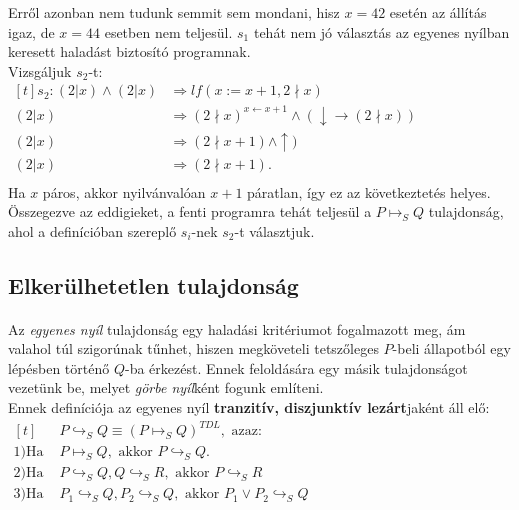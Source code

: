 \documentclass[12pt]{article}
\newcommand{\egyenesnyil}[2]{\ensuremath{#1 \mapsto_S #2}}
\newcommand{\gorbenyil}[2]{\ensuremath{#1 \hookrightarrow_S #2}}
\begin{document}
	Erről azonban nem tudunk semmit sem mondani, hisz $x=42$ esetén az állítás igaz, de $x=44$ esetben nem teljesül. $s_1$ tehát nem jó választás az egyenes nyílban keresett haladást biztosító programnak.\\
	Vizsgáljuk $s_2$-t:\\
	$
	\begin{aligned}[t]
	s_2: (2|x) \land (2|x) &\Rightarrow lf(x:=x+1, 2\nmid x)\\
	(2|x) &\Rightarrow (2\nmid x)^{x\leftarrow x+1} \land (\downarrow \rightarrow (2\nmid x))\\
	(2|x) &\Rightarrow (2\nmid x+1) \land \uparrow)\\
	(2|x) &\Rightarrow (2 \nmid x+1).\\
	\end{aligned}
	$
	\\
	Ha $x$ páros, akkor nyilvánvalóan $x+1$ páratlan, így ez az következtetés helyes. Összegezve az eddigieket, a fenti programra tehát teljesül a \egyenesnyil{P}{Q} tulajdonság, ahol a definícióban szereplő $s_i$-nek $s_2$-t választjuk.
	
	\subsection{Elkerülhetetlen tulajdonság}
	\paragraph{} Az \textit{egyenes nyíl} tulajdonság egy haladási kritériumot fogalmazott meg, ám valahol túl szigorúnak tűnhet, hiszen megköveteli tetszőleges $P$-beli állapotból egy lépésben történő $Q$-ba érkezést. Ennek feloldására egy másik tulajdonságot vezetünk be, melyet \textit{görbe nyíl}ként fogunk említeni.\\
	Ennek definíciója az egyenes nyíl \textbf{tranzitív, diszjunktív lezárt}jaként áll elő:\\
	$
	\begin{aligned}[t]
	&P \hookrightarrow_S Q \equiv (P\mapsto_S Q)^{TDL}, \text{ azaz:}\\
	1) \text{Ha } &\egyenesnyil{P}{Q}, \text{ akkor } \gorbenyil{P}{Q}.\\
	2) \text{Ha } &\gorbenyil{P}{Q}, \gorbenyil{Q}{R}, \text{ akkor } \gorbenyil{P}{R}\\
	3) \text{Ha } &\gorbenyil{P_1}{Q}, \gorbenyil{P_2}{Q}, \text{ akkor } \gorbenyil{P_1 \lor P_2}{Q}\\
	\end{aligned}
	$
\end{document}
